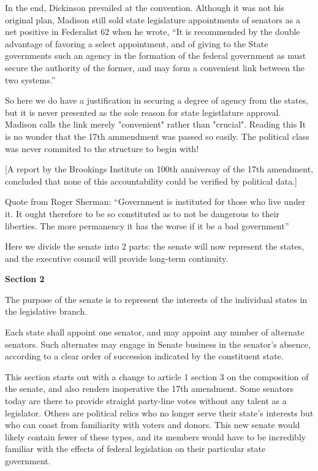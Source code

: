 \documentclass{article}
\begin{document}
In the end, Dickinson prevailed at the convention. Although it was not his original plan, Madison still sold state legislature appointments of senators as a net positive in Federalist 62 when he wrote, “It is recommended by the double advantage of favoring a select appointment, and of giving to the State governments such an agency in the formation of the federal government as must secure the authority of the former, and may form a convenient link between the two systems.”\cite{Federalist62}

So here we do have a justification in securing a degree of agency from the states, but it is never presented as the sole reason for state legistlature approval. Madison calls the link merely "convenient" rather than "crucial". Reading this It is no wonder that the 17th ammendment was passed so easily. The political class was never commited to the structure to begin with!

[A report by the Brookings Institute on 100th anniversay of the 17th amendment, concluded that none of this accountability could be verified by political data\cite{Schiller}.]

Quote from Roger Sherman: “Government is instituted for those who live under it. It ought therefore to be so constituted as to not be dangerous to their liberties. The more permanency it has the worse if it be a bad government”\cite{Madison}

Here we divide the senate into 2 parts: the senate will now represent the states, and the executive council will provide long-term continuity.

\begin{quoting}
\textbf{Section 2}

The purpose of the senate is to represent the interests of the individual states in the legislative branch.

Each state shall appoint one senator, and may appoint any number of alternate senators. Such alternates may engage in Senate business in the senator’s absence, according to a clear order of succession indicated by the constituent state.
\end{quoting}

This section starts out with a change to article 1 section 3 on the composition of the senate, and also renders inoperative the 17th amendment. Some senators today are there to provide straight party-line votes without any talent as a legislator. Others are political relics who no longer serve their state’s interests but who can coast from familiarity with voters and donors. This new senate would likely contain fewer of these types, and its members would have to be incredibly familiar with the effects of federal legislation on their particular state government.
\end{document}
